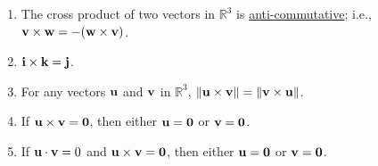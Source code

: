 \documentclass[12pt]{article}
\newif\ifans
\begin{document}
\begin{enumerate}
\begin{enumerate}

\item The cross product of two vectors in $\mathbb{R}^3$ is \underline{anti-commutative}; i.e., ${\bf v}\times{\bf w}=-({\bf w}\times{\bf v})$.

\ifans{\fbox{True}} \fi

\item ${\bf i}\times{\bf k}={\bf j}$.

\ifans{\fbox{False; ${\bf i}\times{\bf k}=-{\bf j}$}} \fi

\item For any vectors ${\bf u}$ and ${\bf v}$ in $\mathbb{R}^3$, $\|{\bf u}\times{\bf v}\|=\|{\bf v}\times{\bf u}\|$.

\ifans{\fbox{True}} \fi

\item If ${\bf u}\times{\bf v}={\bf 0}$, then either ${\bf u}={\bf 0}$ or ${\bf v}={\bf 0}$.

\ifans{\fbox{False; If ${\bf u}$ is parallel to ${\bf v}$, then ${\bf u}\times{\bf v}={\bf 0}$.}} \fi

\item If ${\bf u}\cdot {\bf v}=0$ and ${\bf u}\times{\bf v}={\bf 0}$, then either ${\bf u}={\bf 0}$ or ${\bf v}={\bf 0}$.

\ifans{\fbox{True}} \fi

\end{enumerate}

\end{enumerate}
\end{document}
